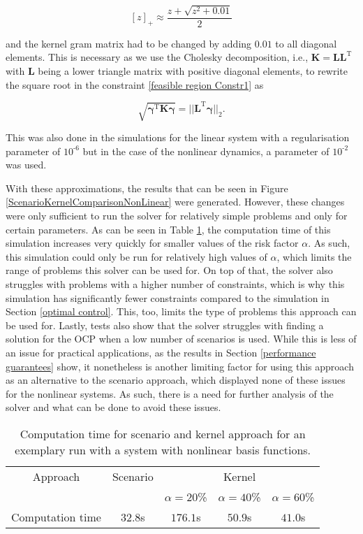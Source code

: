 \begin{equation} \label{max function}
[z]_+ \approx \frac{z + \sqrt{z^2 + 0.01}}{2}
\end{equation}

and the kernel gram matrix had to be changed by adding $0.01$ to all diagonal elements. This is necessary as we use the Cholesky decomposition, i.e., $\boldsymbol{K} = \boldsymbol{L} \boldsymbol{L}^\text{T}$ with $\boldsymbol{L}$ being a lower triangle matrix with positive diagonal elements, to rewrite the square root in the constraint \eqref{feasible region Constr1} as

\begin{equation} \label{square root}
\sqrt{\boldsymbol{\gamma}^\text{T}\boldsymbol{K}\boldsymbol{\gamma}} = ||\boldsymbol{L}^\text{T} \boldsymbol{\gamma}||_2.
\end{equation}

This was also done in the simulations for the linear system with a regularisation parameter of $10^{\text{-}6}$ but in the case of the nonlinear dynamics, a parameter of $10^{\text{-}2}$ was used.

With these approximations, the results that can be seen in Figure \ref{ScenarioKernelComparisonNonLinear} were generated. However, these changes were only sufficient to run the solver for relatively simple problems and only for certain parameters. As can be seen in Table \ref{tab:computation times}, the computation time of this simulation increases very quickly for smaller values of the risk factor $\alpha$. As such, this simulation could only be run for relatively high values of $\alpha$, which limits the range of problems this solver can be used for. On top of that, the solver also struggles with problems with a higher number of constraints, which is why this simulation has significantly fewer constraints compared to the simulation in Section \ref{optimal control}. This, too, limits the type of problems this approach can be used for. Lastly, tests also show that the solver struggles with finding a solution for the OCP when a low number of scenarios is used. While this is less of an issue for practical applications, as the results in Section \ref{performance guarantees} show, it nonetheless is another limiting factor for using this approach as an alternative to the scenario approach, which displayed none of these issues for the nonlinear systems. As such, there is a need for further analysis of the solver and what can be done to avoid these issues.


\begin{table}
\centering
\begin{tabular}{|c| c| c| c| c|}
\hline
Approach & Scenario &  \multicolumn{3}{|c|}{Kernel}\\  \cline{3-5} & &  $\alpha = 20$\% & $\alpha = 40$\% & $\alpha = 60$\% \\
\hline
Computation time & $32.8$s & $176.1$s & $50.9$s & $41.0$s\\
\hline
\end{tabular}
\caption{Computation time for scenario and kernel approach for an exemplary run with a system with nonlinear basis functions.}
\label{tab:computation times}
\end{table} 

